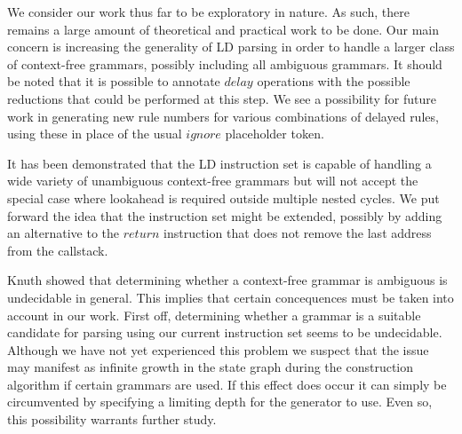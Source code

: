 \documentclass[a4paper,11pt]{article}
\begin{document}
We consider our work thus far to be exploratory in nature.
As such, there remains a large amount of theoretical and practical work to be done.
Our main concern is increasing the generality of LD parsing in order to handle a larger class of context-free grammars, possibly including all ambiguous grammars. 
It should be noted that it is possible to annotate $delay$ operations with the possible reductions that could be performed at this step.
We see a possibility for future work in generating new rule numbers for various combinations of delayed rules, using these in place of the usual $ignore$ placeholder token.


It has been demonstrated that the LD instruction set is capable of handling a wide variety of unambiguous context-free grammars but will not accept the special case where lookahead is required outside multiple nested cycles.
We put forward the idea that the instruction set might be extended, possibly by adding an alternative to the $return$ instruction that does not remove the last address from the callstack.

Knuth showed that determining whether a context-free grammar is ambiguous is undecidable in general\cite{knuth65}. 
This implies that certain concequences must be taken into account in our work. 
First off, determining whether a grammar is a suitable candidate for parsing using our current instruction set seems to be undecidable.
Although we have not yet experienced this problem we suspect that the issue may manifest as infinite growth in the state graph during the construction algorithm if certain grammars are used.
If this effect does occur it can simply be circumvented by specifying a limiting depth for the generator to use. 
Even so, this possibility warrants further study.
\end{document}

